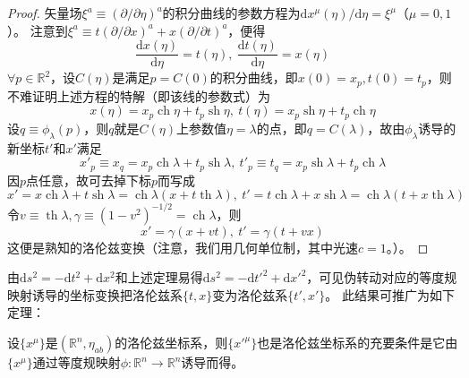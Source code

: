 \begin{proof}
	矢量场$\xi^a \equiv (\partial / \partial\eta)^a$的积分曲线的参数方程为$\mathrm{d}x^\mu(\eta) / \mathrm{d}\eta = \xi^\mu$（$\mu = 0, 1$）。
	注意到$\xi^a \equiv t(\partial / \partial x)^a + x(\partial / \partial t)^a$，便得
	$$\frac{\mathrm{d}x(\eta)}{\mathrm{d}\eta} = t(\eta), ~ \frac{\mathrm{d}t(\eta)}{\mathrm{d}\eta} = x(\eta)$$
	$\forall p \in \mathbb{R}^2$，设$C(\eta)$是满足$p = C(0)$的积分曲线，即$x(0) = x_p, t(0) = t_p$，则不难证明上述方程的特解（即该线的参数式）为
	$$x(\eta) = x_p\operatorname{ch}\eta + t_p\operatorname{sh}\eta, ~ t(\eta) = x_p\operatorname{sh}\eta + t_p\operatorname{ch}\eta$$
	设$q \equiv \phi_\lambda(p)$，则$q$就是$C(\eta)$上参数值$\eta = \lambda$的点，即$q = C(\lambda)$，故由$\phi_\lambda$诱导的新坐标$t'$和$x'$满足
	$$x'_p \equiv x_q = x_p\operatorname{ch}\lambda + t_p\operatorname{sh}\lambda, ~ t'_p \equiv t_q = x_p\operatorname{sh}\lambda + t_p\operatorname{ch}\lambda$$
	因$p$点任意，故可去掉下标$p$而写成
	$$x' = x\operatorname{ch}\lambda + t\operatorname{sh}\lambda = \operatorname{ch}\lambda(x + t\operatorname{th}\lambda), ~ t' = t\operatorname{ch}\lambda + x\operatorname{sh}\lambda = \operatorname{ch}\lambda(t + x\operatorname{th}\lambda)$$
	令$v \equiv \operatorname{th}\lambda, \gamma \equiv (1 - v^2)^{-1/2} = \operatorname{ch}\lambda$，则
	$$x' = \gamma(x + vt), ~ t'= \gamma(t + vx)$$
	这便是熟知的洛伦兹变换（注意，我们用几何单位制，其中光速$c = 1$。）。
\end{proof}

由$\mathrm{d}s^2 = -\mathrm{d}t^2 + \mathrm{d}x^2$和上述定理易得$\mathrm{d}s^2 = -\mathrm{d}t'^2 + \mathrm{d}x'^2$，可见伪转动对应的等度规映射诱导的坐标变换把洛伦兹系$\{t, x\}$变为洛伦兹系$\{t', x'\}$。
此结果可推广为如下定理：

\begin{theorem}
	设$\{x^\mu\}$是$(\mathbb{R}^n, \eta_{ab})$的洛伦兹坐标系，则$\{x'^\mu\}$也是洛伦兹坐标系的充要条件是它由$\{x^\mu\}$通过等度规映射$\phi \colon \mathbb{R}^n \to \mathbb{R}^n$诱导而得。
\end{theorem}

